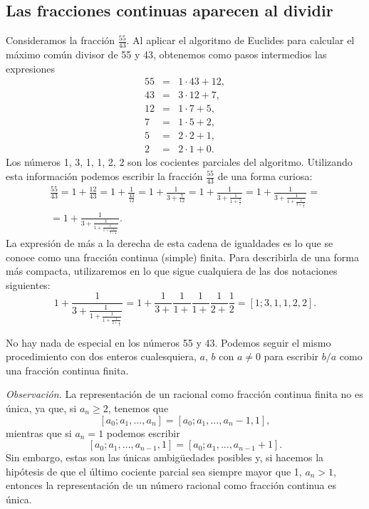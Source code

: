 \subsection{Las fracciones continuas aparecen al dividir} 

Consideramos la
fracci\'on $\frac{55}{43}$. Al aplicar el algoritmo de Euclides para calcular el
m\'aximo com\'un divisor de 55 y 43, obtenemos como pasos intermedios las
expresiones
$$
\begin{array}{rcl}
55&=&1\cdot 43+12,\\
43&=&3\cdot 12+7,\\
12&=&1\cdot 7+5,\\
7&=&1\cdot 5+2,\\
5&=&2\cdot 2+1,\\
2&=&2\cdot 1+0.
\end{array}
$$
Los n\'umeros 1, 3, 1, 1, 2, 2 son los cocientes parciales del algoritmo. 
Utilizando esta informaci\'on podemos escribir la fracci\'on $\frac{55}{43}$ de
una forma curiosa:
$$
\begin{array}{l}
\frac{55}{43}=1+\frac{12}{43}=1+\frac1{\frac{43}{12}}=1+\frac1{3+\frac7{12}}
=1+\frac1{3+\frac1{1+\frac57}}=1+\frac1{3+\frac1{1+\frac1{2+\frac25}}}
=\\
=1+\frac1{3+\frac1{1+\frac1{1+\frac1{2+\frac12}}}}.
\end{array}
$$
La expresi\'on de m\'as a la derecha de esta cadena de igualdades es lo que se
conoce como una fracci\'on continua (simple) finita. Para describirla de una
forma m\'as compacta, utilizaremos en lo que sigue cualquiera de las dos
notaciones siguientes:
$$
1+\frac1{3+\frac1{1+\frac1{1+\frac1{2+\frac12}}}}=1+\frac1{3+}\frac1{1+}\frac1{
1+}\frac1{2+}\frac12=[1;3,1,1,2,2].
$$

No hay nada de especial en los n\'umeros 55 y 43. Podemos seguir el mismo
procedimiento con dos enteros cualesquiera, $a$, $b$ con $a\ne0$ para escribir
$b/a$ como una fracci\'on continua finita.

\noindent\emph{Observaci\'on. }
La representaci\'on de un racional como fracci\'on continua finita no es
\'unica, ya que, si $a_n\ge2$, tenemos que
$$
[a_0;a_1,\dots,a_n]=[a_0;a_1,\dots, a_n-1,1],
$$
mientras que si $a_n=1$ podemos escribir
$$
[a_0;a_1,\dots,a_{n-1},1]=[a_0;a_1,\dots, a_{n-1}+1].
$$
Sin embargo, estas son las \'unicas ambig\"uedades posibles y, si hacemos la
hip\'otesis de que el \'ultimo cociente parcial sea siempre mayor que 1,
$a_n>1$, entonces la representaci\'on de un n\'umero racional como fracci\'on
continua es \'unica.


